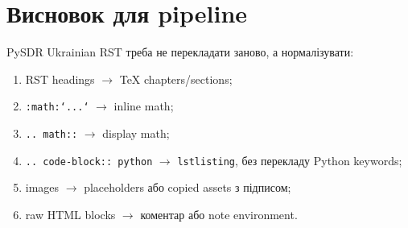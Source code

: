 \section{Висновок для pipeline}
PySDR Ukrainian RST треба не перекладати заново, а нормалізувати:
\begin{enumerate}
\item RST headings $\rightarrow$ TeX chapters/sections;
\item \texttt{:math:`...`} $\rightarrow$ inline math;
\item \texttt{.. math::} $\rightarrow$ display math;
\item \texttt{.. code-block:: python} $\rightarrow$ \texttt{lstlisting}, без перекладу Python keywords;
\item images $\rightarrow$ placeholders або copied assets з підписом;
\item raw HTML blocks $\rightarrow$ коментар або note environment.
\end{enumerate}

